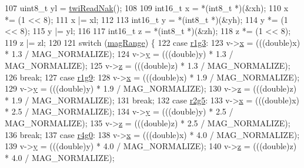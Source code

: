 \begin{DoxyCode}
107     uint8\_t yl = \hyperlink{group__twi_ga5fad19b3784aeaa9ae995e64f9e965b8}{twiReadNak}();
108 
109     int16\_t x = *(int8\_t *)(&xh);
110     x *= (1 << 8);
111     x |= xl;
112 
113     int16\_t y = *(int8\_t *)(&yh);
114     y *= (1 << 8);
115     y |= yl;
116 
117     int16\_t z = *(int8\_t *)(&zh);
118     z *= (1 << 8);
119     z |= zl;
120 
121     \textcolor{keywordflow}{switch} (\hyperlink{group__mag_gaae12e12b371d0bcebe05462384a519a2}{magRange}) \{
122         \textcolor{keywordflow}{case} \hyperlink{group__mag_gga3af649d913d146d6654db2354d88c18aa18e06791b32b1772765ff7e54d3e24fd}{r1g3}:
123             v->\hyperlink{struct_vector3f_af88b946fb90d5f08b5fb740c70e98c10}{x} = (((double)x) * 1.3 / MAG\_NORMALIZE);
124             v->\hyperlink{struct_vector3f_ab927965981178aa1fba979a37168db2a}{y} = (((double)y) * 1.3 / MAG\_NORMALIZE);
125             v->\hyperlink{struct_vector3f_ab3e6ed577a7c669c19de1f9c1b46c872}{z} = (((double)z) * 1.3 / MAG\_NORMALIZE);
126             \textcolor{keywordflow}{break};
127         \textcolor{keywordflow}{case} \hyperlink{group__mag_gga3af649d913d146d6654db2354d88c18aa8cab223a26c8b984d14dd7214ec4f5f6}{r1g9}:
128             v->\hyperlink{struct_vector3f_af88b946fb90d5f08b5fb740c70e98c10}{x} = (((double)x) * 1.9 / MAG\_NORMALIZE);
129             v->\hyperlink{struct_vector3f_ab927965981178aa1fba979a37168db2a}{y} = (((double)y) * 1.9 / MAG\_NORMALIZE);
130             v->\hyperlink{struct_vector3f_ab3e6ed577a7c669c19de1f9c1b46c872}{z} = (((double)z) * 1.9 / MAG\_NORMALIZE);
131             \textcolor{keywordflow}{break};
132         \textcolor{keywordflow}{case} \hyperlink{group__mag_gga3af649d913d146d6654db2354d88c18aa19f90e5cf717669e72908f8d8a1c9f89}{r2g5}:
133             v->\hyperlink{struct_vector3f_af88b946fb90d5f08b5fb740c70e98c10}{x} = (((double)x) * 2.5 / MAG\_NORMALIZE);
134             v->\hyperlink{struct_vector3f_ab927965981178aa1fba979a37168db2a}{y} = (((double)y) * 2.5 / MAG\_NORMALIZE);
135             v->\hyperlink{struct_vector3f_ab3e6ed577a7c669c19de1f9c1b46c872}{z} = (((double)z) * 2.5 / MAG\_NORMALIZE);
136             \textcolor{keywordflow}{break};
137         \textcolor{keywordflow}{case} \hyperlink{group__mag_gga3af649d913d146d6654db2354d88c18aa402a6d56b75bc48c8521500dd8b38bd8}{r4g0}:
138             v->\hyperlink{struct_vector3f_af88b946fb90d5f08b5fb740c70e98c10}{x} = (((double)x) * 4.0 / MAG\_NORMALIZE);
139             v->\hyperlink{struct_vector3f_ab927965981178aa1fba979a37168db2a}{y} = (((double)y) * 4.0 / MAG\_NORMALIZE);
140             v->\hyperlink{struct_vector3f_ab3e6ed577a7c669c19de1f9c1b46c872}{z} = (((double)z) * 4.0 / MAG\_NORMALIZE);

\end{DoxyCode}
